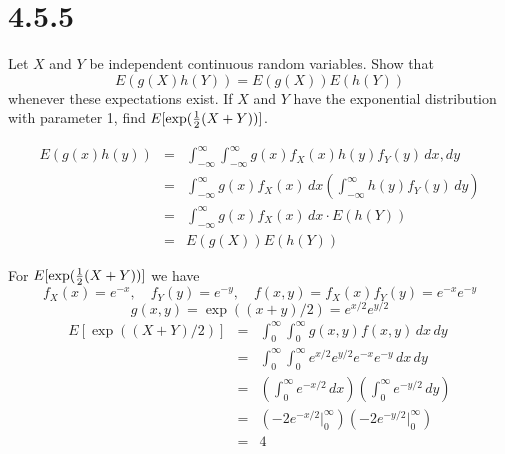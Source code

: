 \section*{4.5.5}
Let $X$ and $Y$ be independent continuous random variables.
Show that
$$E(g(X)h(Y))=E(g(X))E(h(Y))$$
whenever these expectations exist.
If $X$ and $Y$ have the exponential distribution with parameter 1,
find $E[\exp({1\over2}(X+Y))]$.

\begin{eqnarray*}
E(g(x)h(y))
&=&\int_{-\infty}^\infty\int_{-\infty}^\infty
g(x)f_X(x)h(y)f_Y(y)\,dx,dy\\
&=&\int_{-\infty}^\infty
g(x)f_X(x)\,dx\left(
\int_{-\infty}^\infty h(y)f_Y(y)\,dy\right)\\
&=&\int_{-\infty}^\infty g(x)f_X(x)\,dx\cdot E(h(Y))\\
&=&E(g(X))E(h(Y))
\end{eqnarray*}

\bigskip
\noindent
For $E[\exp({1\over2}(X+Y))]$ we have
$$f_X(x)=e^{-x},\quad f_Y(y)=e^{-y},\quad f(x,y)=f_X(x)f_Y(y)
=e^{-x}e^{-y}$$
$$g(x,y)=\exp((x+y)/2)=e^{x/2}e^{y/2}$$
\begin{eqnarray*}
E[\exp((X+Y)/2)]
&=&\int_0^\infty\int_0^\infty g(x,y)f(x,y)\,dx\,dy\\
&=&\int_0^\infty\int_0^\infty e^{x/2}e^{y/2}e^{-x}e^{-y}\,dx\,dy\\
&=&\left(\int_0^\infty e^{-x/2}\,dx\right)
\left(\int_0^\infty e^{-y/2}\,dy\right)\\
&=&\left(-2e^{-x/2}\bigg|_0^\infty\right)
\left(-2e^{-y/2}\bigg|_0^\infty\right)\\
&=&4
\end{eqnarray*}
